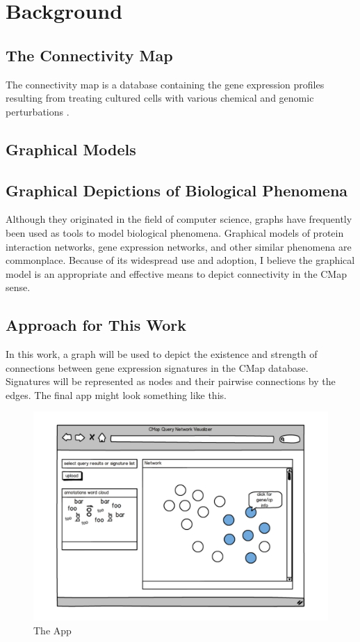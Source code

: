 \documentclass[12pt]{article}
\begin{document}
\section{Background}
\subsection{The Connectivity Map}
The connectivity map is a database containing the gene expression profiles resulting from treating cultured cells with various chemical and genomic perturbations \cite{lamb2006}.
\subsection{Graphical Models}
\subsection{Graphical Depictions of Biological Phenomena}
Although they originated in the field of computer science, graphs have frequently been used as tools to model biological phenomena. Graphical models of protein interaction networks, gene expression networks, and other similar phenomena are commonplace. Because of its widespread use and adoption, I believe the graphical model is an appropriate and effective means to depict connectivity in the CMap sense.
\subsection{Approach for This Work}
In this work, a graph will be used to depict the existence and strength of connections between gene expression signatures in the CMap database. Signatures will be represented as nodes and their pairwise connections by the edges. The final app might look something like this.
\begin{figure}[h]
\centering
\includegraphics[scale=0.5]{img/app_mockup}
\caption{The App}
\label{fig:app_mockup}
\end{figure}
\end{document}
